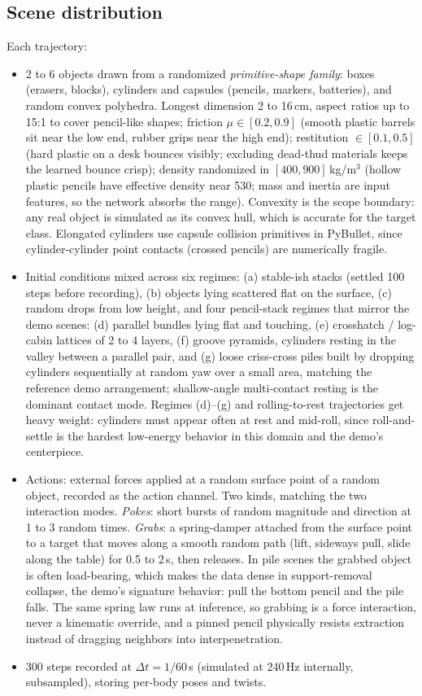 \documentclass[11pt]{article}
\begin{document}
\subsection{Scene distribution}
Each trajectory:
\begin{itemize}[itemsep=2pt]
  \item 2 to 6 objects drawn from a randomized \emph{primitive-shape family}: boxes (erasers, blocks), cylinders and capsules (pencils, markers, batteries), and random convex polyhedra. Longest dimension 2 to 16\,cm, aspect ratios up to 15:1 to cover pencil-like shapes; friction $\mu \in [0.2, 0.9]$ (smooth plastic barrels sit near the low end, rubber grips near the high end); restitution $\in [0.1, 0.5]$ (hard plastic on a desk bounces visibly; excluding dead-thud materials keeps the learned bounce crisp); density randomized in $[400, 900]$\,kg/m$^3$ (hollow plastic pencils have effective density near 530; mass and inertia are input features, so the network absorbs the range). Convexity is the scope boundary: any real object is simulated as its convex hull, which is accurate for the target class. Elongated cylinders use capsule collision primitives in PyBullet, since cylinder-cylinder point contacts (crossed pencils) are numerically fragile.
  \item Initial conditions mixed across six regimes: (a) stable-ish stacks (settled 100 steps before recording), (b) objects lying scattered flat on the surface, (c) random drops from low height, and four pencil-stack regimes that mirror the demo scenes: (d) parallel bundles lying flat and touching, (e) crosshatch / log-cabin lattices of 2 to 4 layers, (f) groove pyramids, cylinders resting in the valley between a parallel pair, and (g) loose criss-cross piles built by dropping cylinders sequentially at random yaw over a small area, matching the reference demo arrangement; shallow-angle multi-contact resting is the dominant contact mode. Regimes (d)--(g) and rolling-to-rest trajectories get heavy weight: cylinders must appear often at rest and mid-roll, since roll-and-settle is the hardest low-energy behavior in this domain and the demo's centerpiece.
  \item Actions: external forces applied at a random surface point of a random object, recorded as the action channel. Two kinds, matching the two interaction modes. \emph{Pokes}: short bursts of random magnitude and direction at 1 to 3 random times. \emph{Grabs}: a spring-damper attached from the surface point to a target that moves along a smooth random path (lift, sideways pull, slide along the table) for 0.5 to 2\,s, then releases. In pile scenes the grabbed object is often load-bearing, which makes the data dense in support-removal collapse, the demo's signature behavior: pull the bottom pencil and the pile falls. The same spring law runs at inference, so grabbing is a force interaction, never a kinematic override, and a pinned pencil physically resists extraction instead of dragging neighbors into interpenetration.
  \item 300 steps recorded at $\Delta t = 1/60$\,s (simulated at 240\,Hz internally, subsampled), storing per-body poses and twists.
\end{itemize}
\end{document}
